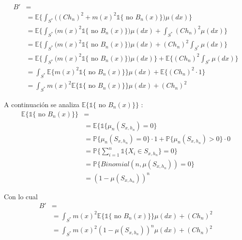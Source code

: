 \documentclass[12pt, a4paper]{article}
\begin{document}
$$
\begin{aligned}
  B' &= \\
  &= \mathds{E} \Bigg\{ \int_{S^{*}} \Big(
    (C h_n)^2 + m(x)^2 \mathds{1}\{ \text{ no } B_n(x) \}
    \Big) \mu(dx) 
  \Bigg\} \\
  &= \mathds{E} \Bigg\{ \int_{S^{*}} \Big(
     m(x)^2 \mathds{1}\{ \text{ no } B_n(x) \}
    \Big) \mu(dx) 
    +
    \int_{S^{*}} (C h_n)^2 \mu(dx) 
  \Bigg\} \\
  &= \mathds{E} \Bigg\{ \int_{S^{*}} \Big(
     m(x)^2 \mathds{1}\{ \text{ no } B_n(x) \}
    \Big) \mu(dx) 
    +
    (C h_n)^2 \int_{S^{*}} \mu(dx) 
  \Bigg\} \\
  &= \mathds{E} \Bigg\{ \int_{S^{*}} \Big(
     m(x)^2 \mathds{1}\{ \text{ no } B_n(x) \}
    \Big) \mu(dx) 
    \Bigg\}
    +
    \mathds{E} \Bigg\{
      (C h_n)^2 \int_{S^{*}} \mu(dx) 
    \Bigg\} \\
  &= \int_{S^{*}} \mathds{E} \bigg\{ 
     m(x)^2 \mathds{1}\{ \text{ no } B_n(x) \}
    \bigg\}
    \mu(dx) 
    +
    \mathds{E} \Bigg\{
      (C h_n)^2 \cdot 1
    \Bigg\} \\
    &= \int_{S^{*}} m(x)^2 \mathds{E} \bigg\{ 
      \mathds{1}\{ \text{ no } B_n(x) \}
    \bigg\}
    \mu(dx) 
    + (C h_n)^2
\end{aligned}
$$

A continuación se analiza $\mathds{E} \bigg\{ 
  \mathds{1}\{ \text{ no } B_n(x) \}
\bigg\}$ :
$$
\begin{aligned}
\mathds{E} \bigg\{ 
      \mathds{1}\{ \text{ no } B_n(x) \}
    \bigg\}&= \\
&= \mathds{E} \bigg\{ 
  \mathds{1}\{
    \mu_n(S_{x,h_n})=0
  \}\\
&= \mathds{P} \bigg\{ 
  \mu_n(S_{x,h_n})=0
\bigg\} \cdot 1 
+ 
\mathds{P} \bigg\{ 
    \mu_n(S_{x,h_n})>0
\bigg\} \cdot 0 \\
&= \mathds{P} \bigg\{ 
  \sum_{i=1}^n \mathds{1} \{ X_i \in S_{x,h_n} \} =0
\bigg\} \\
&= \mathds{P} \bigg\{ 
  Binomial(n,\mu(S_{x,h_n}))=0
\bigg\} \\
&= (1-\mu(S_{x,h_n}))^n
\end{aligned}
$$

Con lo cual
$$
\begin{aligned}
B' &= \\
&= \int_{S^{*}} m(x)^2 \mathds{E} \bigg\{ 
  \mathds{1}\{ \text{ no } B_n(x) \}
\bigg\}
\mu(dx) 
+ (C h_n)^2 \\
&= \int_{S^{*}} m(x)^2 (1-\mu(S_{x,h_n}))^n \mu(dx) 
+ (C h_n)^2
\end{aligned}
$$
\end{document}
